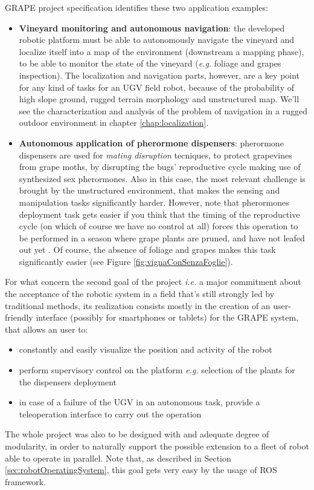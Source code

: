 \ac{GRAPE} project specification identifies these two application examples:
\begin{itemize}
	\item \textbf{Vineyard monitoring and autonomous navigation}: the developed robotic platform must be able to autonomously navigate the vineyard and localize itself into a map of the environment (downstream a mapping phase), to be able to monitor the state of the vineyard (\textit{e.g.} foliage and grapes inspection). The localization and navigation parts, however, are a key point for any kind of tasks for an \ac{UGV} field robot, because of the probability of high slope ground, rugged terrain morphology and unstructured map. We'll see the characterization and analysis of the problem of navigation in a rugged outdoor environment in chapter \ref{chap:localization}.
	\item \textbf{Autonomous application of pherormone dispensers}: pherormone dispensers are used for \textit{mating disruption} tecniques, to protect grapevines from grape moths, by disrupting the bugs' reproductive cycle making use of synthesized sex pherormones. Also in this case, the most relevant challenge is brought by the unstructured environment, that makes the sensing and manipulation tasks significantly harder.  However, note that pherormones deployment task gets easier if you think that the timing of the reproductive cycle (on which of course we have no control at all) forces this operation to be performed in a season where grape plants are pruned, and have not leafed out yet \parencite{mateDisruptionEfficiency}. Of course, the absence of foliage and grapes makes this task significantly easier (see Figure \ref{fig:vignaConSenzaFoglie}).
\end{itemize}

For what concern the second goal of the project \textit{i.e.} a major commitment about the acceptance of the robotic system in a field that's still strongly led by traditional methods, its realization consists mostly in the creation of an user-friendly interface (possibly for smartphones or tablets) for the \ac{GRAPE} system, that allows an user to:
\begin{itemize}
	\item constantly and easily visualize the position and activity of the robot 
	\item perform supervisory control on the platform \textit{e.g.} selection of the plants for the dispensers deployment
	\item in case of a failure of the \ac{UGV} in an autonomous task, provide a teleoperation interface to carry out the operation
\end{itemize}
The whole project was also to be designed with and adequate degree of modularity, in order to naturally support the possible extension to a fleet of robot able to operate in parallel. Note that, as described in Section \ref{sec:robotOperatingSystem}, this goal gets very easy by the usage of \ac{ROS} framework.


